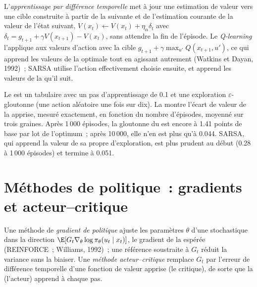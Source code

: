 \begin{definition}\label{def:ml:reinforcement-learning-foundations:td}
L'\emph{apprentissage par différence temporelle} met à jour une estimation de valeur vers une cible construite
à partir de la  suivante et de l'estimation courante de la valeur de l'état suivant, $V(x_t)\leftarrow V(x_t) + \eta_\alpha\delta_t$ avec
$\delta_t = g_{t+1} + \gamma V(x_{t+1}) - V(x_t)$, sans attendre la fin de l'épisode. Le \emph{Q-learning}
l'applique aux valeurs d'action avec la cible $g_{t+1} + \gamma\max_{u'}Q(x_{t+1}, u')$, ce qui apprend les valeurs de la  optimale
tout en agissant autrement (Watkins et Dayan, 1992)~; SARSA utilise l'action effectivement choisie ensuite, et apprend les valeurs de la
 qu'il suit.
\end{definition}

Le  est un  tabulaire avec un pas d'apprentissage de 0.1 et une exploration $\varepsilon$-gloutonne (une action aléatoire
une fois sur dix). La  montre l'écart de valeur de la  apprise, mesuré exactement, en fonction du nombre
d'épisodes, moyenné sur trois graines. Après 1\,000 épisodes, la  gloutonne du  est encore à 1.41 points de base par lot de
l'optimum~; après 10\,000, elle n'en est plus qu'à 0.044. SARSA, qui apprend la valeur de sa propre  d'exploration, est plus prudent au début
(0.28 à 1\,000 épisodes) et termine à 0.051.

\section{Méthodes de politique~: gradients et acteur--critique}

\begin{definition}\label{def:ml:reinforcement-learning-foundations:pg}
Une méthode de \emph{gradient de politique} ajuste les paramètres $\theta$ d'une  stochastique dans la direction
$\E[G_t\nabla_\theta\log\pi_\theta(u_t\mid x_t)]$, le gradient de la  espérée (REINFORCE~; Williams, 1992)~; une
référence soustraite à $G_t$ réduit la variance sans la biaiser. Une
\emph{méthode acteur--critique} remplace $G_t$ par l'erreur de différence temporelle d'une fonction de valeur apprise (le critique), de sorte que la 
(l'acteur) apprend à chaque pas.
\end{definition}

